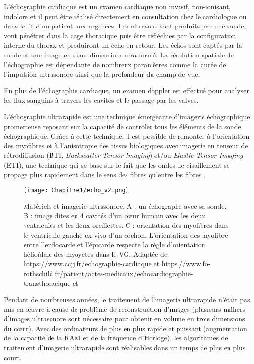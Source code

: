 L’échographie cardiaque est un examen cardiaque non invasif, non-ionisant, indolore et il peut être réalisé directement en consultation chez le cardiologue ou dans le lit d’un patient aux urgences. Les ultrasons sont produits par une sonde, vont pénétrer dans la cage thoracique puis être réfléchies par la configuration interne du thorax et produiront un écho en retour. Les échos sont captés par la sonde et une image en deux dimensions sera formé. La résolution spatiale de l’échographie est dépendante de nombreux paramètres comme la durée de l’impulsion ultrasonore ainsi que la profondeur du champ de vue.

En plus de l’échographie cardiaque, un examen doppler est effectué pour analyser les flux sanguins à travers les cavités et le passage par les valves.

L’échographie ultrarapide est une technique émergeante d’imagerie échographique prometteuse reposant sur la capacité de contrôler tous les éléments de la sonde échographique. Grâce à cette technique, il est possible de remonter à l’orientation des myofibres et à l’anisotropie des tissus biologiques avec imagerie en tenseur de rétrodiffusion \cite{Papadacci2014} (BTI, \textit{Backscatter Tensor Imaging}) et/ou \textit{Elastic Tensor Imaging} (ETI), une technique qui se base sur le fait que les ondes de cisaillement se propage plus rapidement dans le sens des fibres qu’entre les fibres \cite{Agger2020} .

\begin{figure}[!htbp]
  \begin{center}
    \texttt{[image: Chapitre1/echo\_v2.png]}
     \end{center}
    \caption{Matériels et imagerie ultrasonore. A : un échographe avec sa sonde. B : image dites en 4 cavités d’un cœur humain avec les deux ventricules et les deux oreillettes. C : orientation des myofibres dans le ventricule gauche ex vivo d’un cochon. L’orientation des myofibre entre l’endocarde et l’épicarde respecte la règle d’orientation hélioïdale des myoyctes dans le VG.   Adaptée de https://www.ccjj.fr/echographie-cardiaque et https://www.fo-rothschild.fr/patient/actes-medicaux/echocardiographie-transthoracique et \cite{Papadacci2014}}
  \label{fig:fig_echographie}
\end{figure}

Pendant de nombreuses années, le traitement de l’imagerie ultrarapide n’était pas mis en œuvre à cause de problème de reconstruction d’images (plusieurs milliers d’images ultrasonore sont nécessaire pour obtenir en volume en trois dimensions du cœur). Avec des ordinateurs de plus en plus rapide et puissant (augmentation de la capacité de la RAM et de la fréquence d’Horloge), les algorithmes de traitement d’imagerie ultrarapide sont réalisables dans un temps de plus en plus court.

